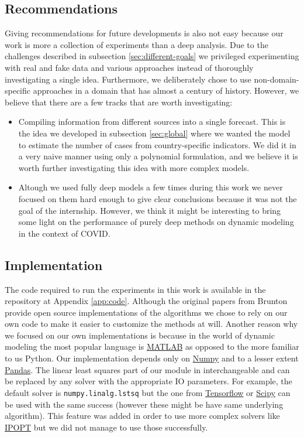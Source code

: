 \documentclass[12pt, letterpaper]{article}
\begin{document}
\subsection{Recommendations}

Giving recommendations for future developments is also not easy because our work is more a collection of experiments than a deep analysis. 
Due to the challenges described in subsection \ref{sec:different-goals} we privileged experimenting with real and fake data and various approaches instead of thoroughly investigating a single idea. 
Furthermore, we deliberately chose to use non-domain-specific approaches in a domain that has almost a century of history.
However, we believe that there are a few tracks that are worth investigating:

\begin{itemize}
	\item Compiling information from different sources into a single forecast. This is the idea we developed in subsection \ref{sec:global} where we wanted the model to estimate the number of cases from country-specific indicators. 
	We did it in a very naive manner using only a polynomial formulation, and we believe it is worth further investigating this idea with more complex models. 
	\item Altough we used fully deep models a few times during this work we never focused on them hard enough to give clear conclusions because it was not the goal of the internship. However, we think it might be interesting to bring some light on the performance of purely deep methods on dynamic modeling in the context of COVID.

\end{itemize}

\subsection{Implementation}

The code required to run the experiments in this work is available in the repository at Appendix \ref{app:code}. Although the original papers from Brunton \cite{sindy, sindy2} provide open source implementations of the algorithms we chose to rely on our own code to make it easier to customize the methods at will. 
Another reason why we focused on our own implementations is because in the world of dynamic modeling the most popular language is \href{https://www.mathworks.com/products/matlab.html}{MATLAB} as opposed to the more familiar to us Python.
Our implementation depends only on \href{https://numpy.org/doc/stable/index.html}{Numpy} and to a lesser extent \href{https://pandas.pydata.org/}{Pandas}.
The linear least squares part of our module in interchangeable and can be replaced by any solver with the appropriate IO parameters. 
For example, the default solver is \texttt{numpy.linalg.lstsq} but the one from \href{https://www.tensorflow.org/}{Tensorflow} or \href{https://www.scipy.org/}{Scipy} can be used with the same success (however these might be have same underlying algorithm).
This feature was added in order to use more complex solvers like \href{https://github.com/coin-or/Ipopt}{IPOPT} but we did not manage to use those successfully.
\end{document}
